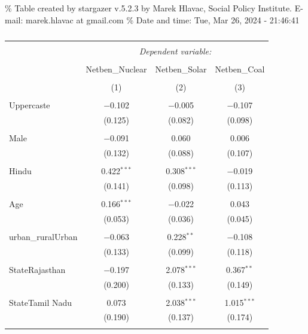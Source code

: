 \documentclass[
]{article}
\begin{document}
\begingroup\setlength{\tabcolsep}{1pt}

\renewcommand{\arraystretch}{0.7}

\% Table created by stargazer v.5.2.3 by Marek Hlavac, Social Policy
Institute. E-mail: marek.hlavac at gmail.com \% Date and time: Tue, Mar
26, 2024 - 21:46:41

\begin{table}[!htbp] \centering 
  \caption{} 
  \label{} 
\begin{tabular}{@{\extracolsep{5pt}}lccc} 
\\[-1.8ex]\hline 
\hline \\[-1.8ex] 
 & \multicolumn{3}{c}{\textit{Dependent variable:}} \\ 
\cline{2-4} 
\\[-1.8ex] & Netben\_Nuclear & Netben\_Solar & Netben\_Coal \\ 
\\[-1.8ex] & (1) & (2) & (3)\\ 
\hline \\[-1.8ex] 
 Uppercaste & $-$0.102 & $-$0.005 & $-$0.107 \\ 
  & (0.125) & (0.082) & (0.098) \\ 
  & & & \\ 
 Male & $-$0.091 & 0.060 & 0.006 \\ 
  & (0.132) & (0.088) & (0.107) \\ 
  & & & \\ 
 Hindu & 0.422$^{***}$ & 0.308$^{***}$ & $-$0.019 \\ 
  & (0.141) & (0.098) & (0.113) \\ 
  & & & \\ 
 Age & 0.166$^{***}$ & $-$0.022 & 0.043 \\ 
  & (0.053) & (0.036) & (0.045) \\ 
  & & & \\ 
 urban\_ruralUrban & $-$0.063 & 0.228$^{**}$ & $-$0.108 \\ 
  & (0.133) & (0.099) & (0.118) \\ 
  & & & \\ 
 StateRajasthan & $-$0.197 & 2.078$^{***}$ & 0.367$^{**}$ \\ 
  & (0.200) & (0.133) & (0.149) \\ 
  & & & \\ 
 StateTamil Nadu & 0.073 & 2.038$^{***}$ & 1.015$^{***}$ \\ 
  & (0.190) & (0.137) & (0.174) \\ 
  & & & \\ 

\end{tabular}
\end{table}
\end{document}
